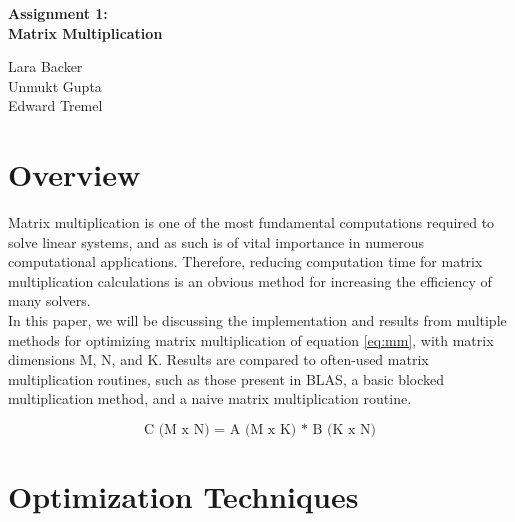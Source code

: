 \documentclass{article}	 %
\begin{document}
\begin{center}
    \Large
    \textbf{Assignment 1: \\ Matrix Multiplication}
    
    \vspace{0.4cm}
    \large
        
    \vspace{0.4cm}
    Lara Backer \\ Unmukt Gupta \\ Edward Tremel

\end{center}


\section{Overview}

Matrix multiplication is one of the most fundamental computations required to solve linear systems, and as such is of vital importance in numerous computational applications. Therefore, reducing computation time for matrix multiplication calculations is an obvious method for increasing the efficiency of many solvers. \\

In this paper, we will be discussing the implementation and results from multiple methods for optimizing matrix multiplication of equation \ref{eq:mm}, with matrix dimensions M, N, and K. Results are compared to often-used matrix multiplication routines, such as those present in BLAS, a basic blocked multiplication method, and a naive matrix multiplication routine. 

\begin{equation}
\text{C (M x N) = A (M x K) * B (K x N)}
\label{eq:mm}
\end{equation}


\section{Optimization Techniques}
\end{document}
